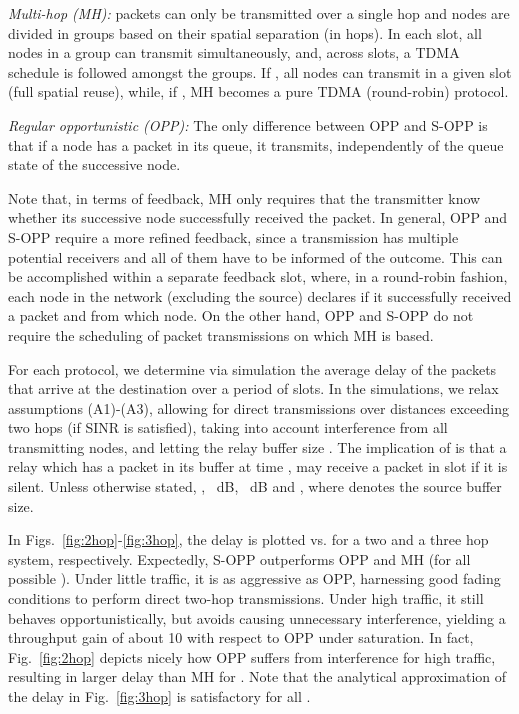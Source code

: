 \documentclass[draftclsnofoot,10pt,onecolumn,letterpaper]{IEEEtran}
\begin{document}
\noindent
{\em Multi-hop (MH):} packets can only be transmitted over a single hop and nodes are divided in groups based on their spatial separation  (in hops). 
In each slot, all nodes in a group can transmit simultaneously, and, across slots, a TDMA schedule is followed amongst the groups. If , all nodes can transmit in a given slot (full spatial reuse), while, if , MH becomes a pure TDMA (round-robin) protocol. 

\noindent 
{\em Regular opportunistic (OPP):} The only difference between OPP and S-OPP is that if a node has a packet in its queue, it transmits, independently of the queue state of the 
successive node.

Note that, in terms of feedback, MH only requires that the transmitter know whether its successive node successfully received the packet. 
In general, OPP and S-OPP require a more refined feedback, since a transmission has multiple potential receivers and all of them have to be informed of the outcome. This can be accomplished
within a separate feedback slot, where, in a round-robin fashion, each node in the network (excluding the source) declares if it successfully received a packet and from which node.
On the other hand, OPP and S-OPP do not require the scheduling of packet transmissions on which MH is based.

For each protocol, we determine via simulation the average delay of the packets that arrive at the destination over a period of  slots.
In the simulations, we relax assumptions (A1)-(A3), allowing
for direct transmissions over distances exceeding two hops (if SINR  is satisfied), taking into account interference from all transmitting nodes, and letting the relay buffer size . The implication of  is that a relay which has a packet in its buffer at time , may receive a packet in slot  if it is silent. 
Unless otherwise stated, , ~dB, ~dB and , where  denotes the source buffer size.

In Figs.~\ref{fig:2hop}-\ref{fig:3hop}, the delay is plotted vs.  for a two and a three hop system, respectively. Expectedly, S-OPP outperforms OPP and MH (for all possible ).
Under little traffic, it is as aggressive as OPP, harnessing good fading conditions to perform direct two-hop transmissions. Under high traffic, it still behaves opportunistically, but avoids causing unnecessary interference, yielding a throughput gain of about 10 with respect to OPP under saturation. In fact, Fig.~\ref{fig:2hop} depicts nicely how OPP suffers from interference for high traffic, resulting in larger delay than MH for . Note that the analytical approximation of the delay in Fig.~\ref{fig:3hop} is satisfactory for all .
\end{document}
